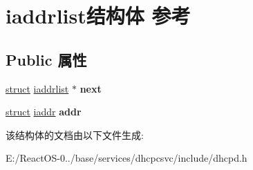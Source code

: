 \hypertarget{structiaddrlist}{}\section{iaddrlist结构体 参考}
\label{structiaddrlist}
\subsection*{Public 属性}
\begin{DoxyCompactItemize}
\item 
\mbox{\label{structiaddrlist_a12b4a4d51d0aaaa7609c9d761cfa7f8f}} 
\hyperlink{interfacestruct}{struct} \hyperlink{structiaddrlist}{iaddrlist} $\ast$ {\bfseries next}
\item 
\mbox{\label{structiaddrlist_a8630b0f5b1da4dd272523ad227798363}} 
\hyperlink{interfacestruct}{struct} \hyperlink{structiaddr}{iaddr} {\bfseries addr}
\end{DoxyCompactItemize}


该结构体的文档由以下文件生成\+:\begin{DoxyCompactItemize}
\item 
E\+:/\+React\+O\+S-\/0../base/services/dhcpcsvc/include/dhcpd.\+h\end{DoxyCompactItemize}
